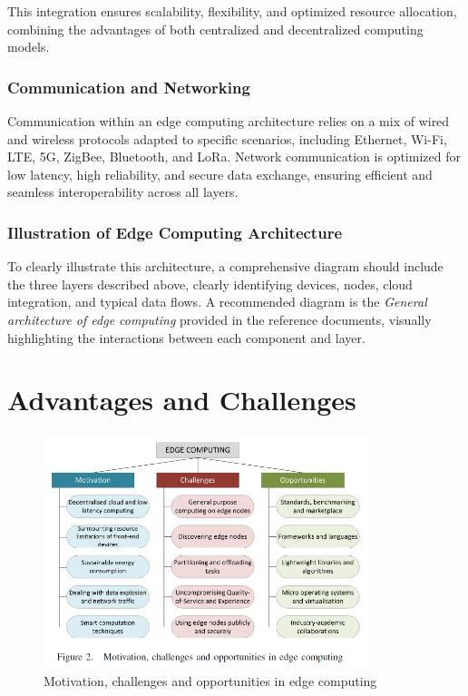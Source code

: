 \documentclass[runningheads]{llncs}
\begin{document}
This integration ensures scalability, flexibility, and optimized resource allocation, combining the advantages of both centralized and decentralized computing models.

\subsubsection{Communication and Networking}
Communication within an edge computing architecture relies on a mix of wired and wireless protocols adapted to specific scenarios, including Ethernet, Wi-Fi, LTE, 5G, ZigBee, Bluetooth, and LoRa. Network communication is optimized for low latency, high reliability, and secure data exchange, ensuring efficient and seamless interoperability across all layers.

\subsubsection{Illustration of Edge Computing Architecture}
To clearly illustrate this architecture, a comprehensive diagram should include the three layers described above, clearly identifying devices, nodes, cloud integration, and typical data flows. A recommended diagram is the \textit{General architecture of edge computing} provided in the reference documents, visually highlighting the interactions between each component and layer.


\section{Advantages and Challenges}

\begin{figure}[ht]
    \centering
    \includegraphics[width=0.85\textwidth]{IMG/10.png}
    \caption{Motivation, challenges and opportunities in edge computing}
    \label{fig:motivation_challenges_opportunities}
    \end{figure}
\end{document}
